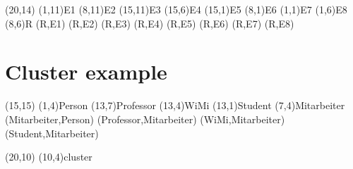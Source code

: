 \documentclass[a4paper,11pt]{article}
\begin{document}
\begin{schema}(20,14)
  \entity(1,11){E1}
  \entity(8,11){E2}
  \entity(15,11){E3}
  \entity(15,6){E4}
  \entity(15,1){E5}
  \entity(8,1){E6}
  \entity(1,1){E7}
  \entity(1,6){E8}
  \relation(8,6){R}
  \connection(R,E1){}
  \connection(R,E2){}
  \connection(R,E3){}
  \connection(R,E4){}
  \connection(R,E5){}
  \connection(R,E6){}
  \connection(R,E7){}
  \connection(R,E8){}
\end{schema}

\section{Cluster example}

\begin{schema}(15,15)
  \entity(1,4){Person}
  \relation(13,7){Professor}
  \relation(13,4){WiMi}
  \relation(13,1){Student}
  \cluster(7,4){Mitarbeiter}
  \connection(Mitarbeiter,Person){}
  \connection(Professor,Mitarbeiter){}
  \connection(WiMi,Mitarbeiter){}
  \connection(Student,Mitarbeiter){}
\end{schema}

\begin{schema}(20,10)
  \cluster(10,4){cluster}
\end{schema}
\end{document}
